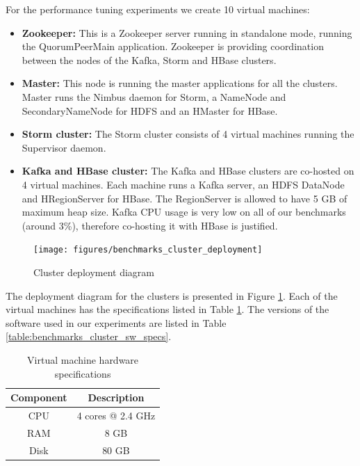 For the performance tuning experiments we create 10 virtual machines:
\begin{itemize}
\item \textbf{Zookeeper:} This is a Zookeeper server running in standalone mode, running the QuorumPeerMain application. Zookeeper is providing coordination between the nodes of the Kafka, Storm and HBase clusters.
\item \textbf{Master:} This node is running the master applications for all the clusters. Master runs the Nimbus daemon for Storm, a NameNode and SecondaryNameNode for HDFS and an HMaster for HBase.
\item \textbf{Storm cluster:} The Storm cluster consists of 4 virtual machines running the Supervisor daemon.
\item \textbf{Kafka and HBase cluster:} The Kafka and HBase clusters are co-hosted on 4 virtual machines. Each machine runs a Kafka server, an HDFS DataNode and HRegionServer for HBase. The RegionServer is allowed to have 5 GB of maximum heap size. Kafka CPU usage is very low on all of our benchmarks (around 3\%), therefore co-hosting it with HBase is justified.
\end{itemize}

\begin{figure}[H]
\centering
\texttt{[image: figures/benchmarks\_cluster\_deployment]}
\caption{Cluster deployment diagram}
\label{figure:benchmarks_cluster_deployment}
\end{figure}

The deployment diagram for the clusters is presented in Figure \ref{figure:benchmarks_cluster_deployment}. Each of the virtual machines has the specifications listed in Table \ref{table:benchmarks_cluster_hw_specs}. The versions of the software used in our experiments are listed in Table \ref{table:benchmarks_cluster_sw_specs}.

\begin{table}[H]
\centering
\begin{tabular}{ |c|c| }
\hline
Component & Description \\ \hline \hline
CPU & 4 cores @ 2.4 GHz \\ \hline
RAM & 8 GB \\ \hline
Disk & 80 GB \\ \hline
\end{tabular}
\caption{Virtual machine hardware specifications}
\label{table:benchmarks_cluster_hw_specs}
\end{table}

